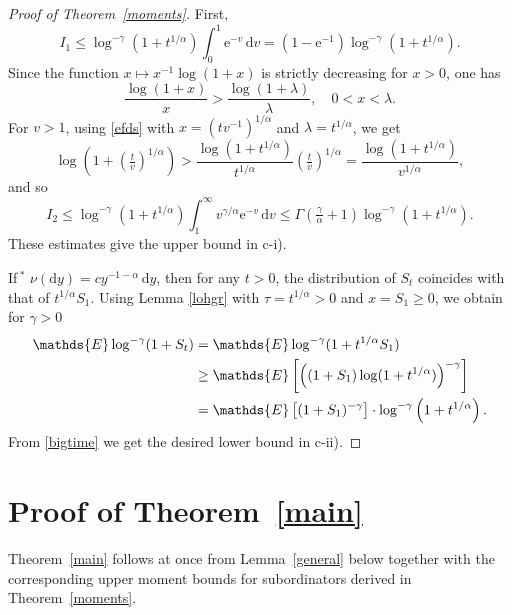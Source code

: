 \documentclass{aptpub}
\newcommand\dup{\mathrm{d}}
\newcommand\eup{\mathrm{e}}                                %
\numberwithin{equation}{section}
\begin{document}
\begin{proof}[Proof of Theorem~\ref{moments}]
First,
$$
    I_1\leq\log^{-\gamma}\left(1+t^{1/\alpha}\right)
    \int_0^1
    \eup^{-v}\,\dup v
    =\left(1-\eup^{-1}\right)
    \log^{-\gamma}\left(1+t^{1/\alpha}\right).
$$
Since the function $x\mapsto x^{-1}\log(1+x)$
is strictly decreasing for $x>0$, one has
\begin{equation}\label{efds}
    \frac{\log(1+x)}{x}>\frac{\log(1+\lambda)}{\lambda},
    \quad 0<x<\lambda.
\end{equation}
For $v>1$, using \eqref{efds} with $x=(tv^{-1})^{1/\alpha}$
and $\lambda=t^{1/\alpha}$, we get
$$
    \log\left(1+\left(\tfrac tv\right)^{1/\alpha}\right)
    >\frac{\log\left(1+t^{1/\alpha}\right)}{t^{1/\alpha}}
    \left(\tfrac tv\right)^{1/\alpha}
    =\frac{\log\left(1+t^{1/\alpha}\right)}{v^{1/\alpha}},
$$
and so
$$
    I_2\leq\log^{-\gamma}\left(1+t^{1/\alpha}\right)
    \int_1^\infty v^{\gamma/\alpha}\eup^{-v}\,\dup v
    \leq\Gamma\left(\tfrac \gamma\alpha+1\right)
    \log^{-\gamma}\left(1+t^{1/\alpha}\right).
$$
These estimates give the upper bound in c-i).


If$\,\mbox{}^*$
$\nu(\dup y)=cy^{-1-\alpha}\,\dup y$, then for any $t>0$, the distribution of $S_t$ coincides with that of $t^{1/\alpha}S_1$.
Using Lemma \ref{lohgr} with $\tau=t^{1/\alpha}>0$ and $x=S_1\geq 0$, we obtain for $\gamma>0$
\begin{align}
    \mathds{E} \log^{-\gamma}(1+S_t)
    &= \mathds{E} \log^{-\gamma}(1+t^{1/\alpha}S_1)\notag\\
    &\geq \mathds{E}\left[\left((1+S_1)\log(1+t^{1/\alpha})\right)^{-\gamma}\right]\label{bigtime}\\
    &=\mathds{E}\left[(1+S_1)^{-\gamma}\right]\cdot\log^{-\gamma}\left(1+t^{1/\alpha}\right).\notag%
\end{align}
From \eqref{bigtime} we get the desired lower bound in c-ii).
\end{proof}



\section{Proof of Theorem~\ref{main}}\label{sec3}

Theorem~\ref{main} follows at once from Lemma~\ref{general} below together with the corresponding upper moment bounds for subordinators derived in Theorem~\ref{moments}.
\end{document}
